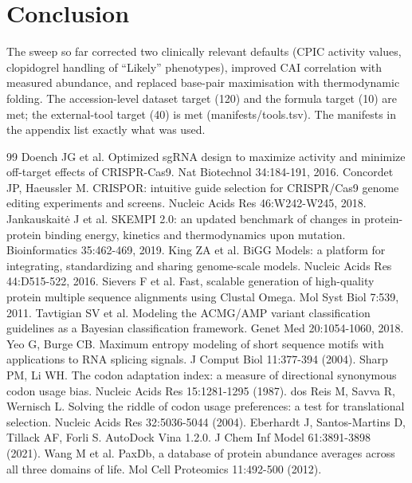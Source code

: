 \documentclass[11pt]{article}
\begin{document}
\section{Conclusion}
The sweep so far corrected two clinically relevant defaults (CPIC activity values, clopidogrel handling of ``Likely'' phenotypes), improved CAI correlation with measured abundance, and replaced base-pair maximisation with thermodynamic folding. The accession-level dataset target (120) and the formula target (10) are met; the external-tool target (40) is met (manifests/tools.tsv). The manifests in the appendix list exactly what was used.




\begin{thebibliography}{99}
 Doench JG et al. Optimized sgRNA design to maximize
activity and minimize off-target effects of CRISPR-Cas9. Nat Biotechnol
34:184-191, 2016.
 Concordet JP, Haeussler M. CRISPOR: intuitive guide
selection for CRISPR/Cas9 genome editing experiments and screens. Nucleic
Acids Res 46:W242-W245, 2018.
 Jankauskait\.e J et al. SKEMPI 2.0: an updated benchmark of
changes in protein-protein binding energy, kinetics and thermodynamics upon
mutation. Bioinformatics 35:462-469, 2019.
 King ZA et al. BiGG Models: a platform for integrating,
standardizing and sharing genome-scale models. Nucleic Acids Res 44:D515-522,
2016.
 Sievers F et al. Fast, scalable generation of high-quality
protein multiple sequence alignments using Clustal Omega. Mol Syst Biol 7:539,
2011.
 Tavtigian SV et al. Modeling the ACMG/AMP variant
classification guidelines as a Bayesian classification framework. Genet Med
20:1054-1060, 2018.
 Yeo G, Burge CB. Maximum entropy modeling of short sequence motifs with applications to RNA splicing signals. J Comput Biol 11:377-394 (2004).
 Sharp PM, Li WH. The codon adaptation index: a measure of directional synonymous codon usage bias. Nucleic Acids Res 15:1281-1295 (1987).
 dos Reis M, Savva R, Wernisch L. Solving the riddle of codon usage preferences: a test for translational selection. Nucleic Acids Res 32:5036-5044 (2004).
 Eberhardt J, Santos-Martins D, Tillack AF, Forli S. AutoDock Vina 1.2.0. J Chem Inf Model 61:3891-3898 (2021).
 Wang M et al. PaxDb, a database of protein abundance averages across all three domains of life. Mol Cell Proteomics 11:492-500 (2012).
\end{thebibliography}
\end{document}

